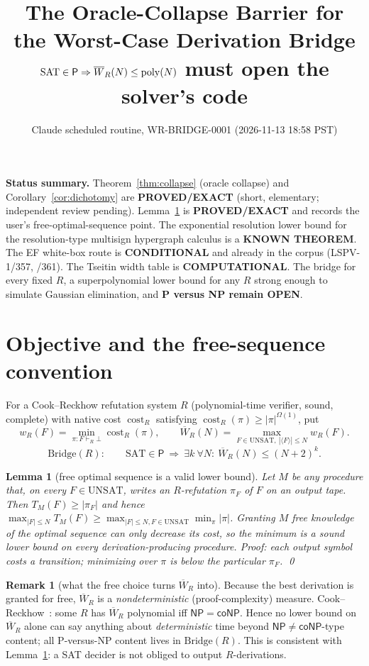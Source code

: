 \documentclass[11pt]{article}
\title{The Oracle-Collapse Barrier for the Worst-Case Derivation Bridge\\
\large $\SAT\in\mathsf P\Rightarrow \Wb_R(N)\le\mathrm{poly}(N)$ must open the solver's code}
\author{Claude scheduled routine, WR-BRIDGE-0001 (2026-11-13 18:58 PST)}
\date{}
\newtheorem{lemma}[theorem]{Lemma}
\theoremstyle{definition}
\newtheorem{remark}[theorem]{Remark}
\newcommand{\SAT}{\mathrm{SAT}}
\newcommand{\UNSAT}{\mathrm{UNSAT}}
\newcommand{\Wb}{\overline W}
\begin{document}
\maketitle

\noindent\textbf{Status summary.}
Theorem~\ref{thm:collapse} (oracle collapse) and Corollary~\ref{cor:dichotomy}
are \textbf{PROVED/EXACT} (short, elementary; independent review pending).
Lemma~\ref{lem:free} is \textbf{PROVED/EXACT} and records the user's
free-optimal-sequence point.
The exponential resolution lower bound for the resolution-type
multisign hypergraph calculus is a \textbf{KNOWN THEOREM}.
The EF white-box route is \textbf{CONDITIONAL} and already in the corpus (LSPV-1/357, /361).
The Tseitin width table is \textbf{COMPUTATIONAL}.
The bridge for every fixed $R$, a superpolynomial lower bound for any $R$ strong enough
to simulate Gaussian elimination, and \textbf{P versus NP remain OPEN}.

\section{Objective and the free-sequence convention}
For a Cook--Reckhow refutation system $R$ (polynomial-time verifier, sound, complete) with
native cost $\operatorname{cost}_R$ satisfying $\operatorname{cost}_R(\pi)\ge|\pi|^{\Omega(1)}$, put
\[
 w_R(F)=\min_{\pi:F\vdash_R\bot}\operatorname{cost}_R(\pi),\qquad
 \Wb_R(N)=\max_{F\in\UNSAT,\ |\langle F\rangle|\le N} w_R(F).
\]
\[
 \mathrm{Bridge}(R):\qquad \SAT\in\mathsf P\ \Longrightarrow\ \exists k\ \forall N:\ \Wb_R(N)\le (N+2)^k .
\]

\begin{lemma}[free optimal sequence is a valid lower bound]\label{lem:free}
Let $M$ be any procedure that, on every $F\in\UNSAT$, writes an $R$-refutation $\pi_F$ of $F$
on an output tape. Then $T_M(F)\ge|\pi_F|$ and hence
$\max_{|F|\le N}T_M(F)\ge \max_{|F|\le N,F\in\UNSAT}\min_\pi|\pi|$.
Granting $M$ free knowledge of the optimal sequence can only decrease its cost, so the minimum is a
sound lower bound on every derivation-producing procedure. \emph{Proof:} each output symbol costs a
transition; minimizing over $\pi$ is below the particular $\pi_F$. \qed
\end{lemma}

\begin{remark}[what the free choice turns $\Wb_R$ into]
Because the best derivation is granted for free, $\Wb_R$ is a \emph{nondeterministic}
(proof-complexity) measure. Cook--Reckhow~\cite{CR79}: some $R$ has $\Wb_R$ polynomial iff
$\mathsf{NP}=\mathsf{coNP}$. Hence no lower bound on $\Wb_R$ alone can say anything about
\emph{deterministic} time beyond $\mathsf{NP}\neq\mathsf{coNP}$-type content; all P-versus-NP
content lives in $\mathrm{Bridge}(R)$. This is consistent with Lemma~\ref{lem:free}: a SAT
decider is not obliged to output $R$-derivations.
\end{remark}
\end{document}
